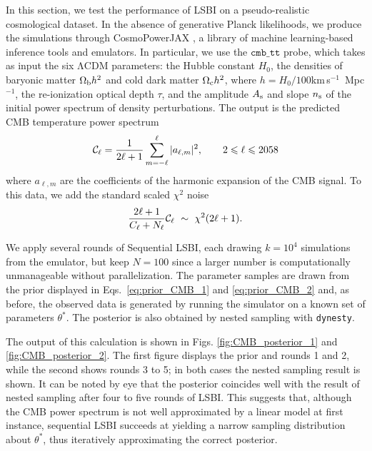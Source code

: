 \documentclass[%
 reprint,
 amsmath,amssymb,
 aps,
]{revtex4-2}
\begin{document}
In this section, we test the performance of LSBI on a pseudo-realistic cosmological dataset. In the absence of generative Planck likelihoods, we produce the simulations through CosmoPowerJAX \cite{piras2023cosmopower,spurio2022cosmopower}, a library of machine learning-based inference tools and emulators. In particular, we use the $\texttt{cmb\_tt}$ probe, which takes as input the six $\mathrm{\Lambda}$CDM parameters: the Hubble constant $H_0$, the densities of baryonic matter $\Omega_\text{b}h^2$ and cold dark matter $\Omega_\text{c}h^2$, where $h = H_0/100$km\,s$^{-1}$\, Mpc$^{-1}$, the re-ionization optical depth $\tau$,  and the amplitude $A_\text{s}$ and slope $n_\text{s}$ of the initial power spectrum of density perturbations.
The output is the predicted CMB temperature power spectrum
\begin{equation}
	\mathcal{C}_\ell = \frac{1}{2\ell+1}\sum_{m=-\ell}^\ell |a_{\ell,m}|^2, \qquad 2\leqslant\ell\leqslant2058
\end{equation}
where $a_{\ell,m}$ are the coefficients of the harmonic expansion of the CMB signal. To this data, we add the standard scaled $\chi^2$ noise
\begin{equation}\label{eq:chi2noise}
	\f{2\ell+1}{C_\ell+N_\ell}\mathcal{C_\ell}\ \sim\  \chi^2(2\ell+1).
\end{equation}


 

We apply several rounds of Sequential LSBI, each drawing $k=10^4$ simulations from the emulator, but keep $N=100$ since a larger number is computationally unmanageable without parallelization. The parameter samples are drawn from the prior displayed in Eqs.~\ref{eq:prior_CMB_1} and \ref{eq:prior_CMB_2} and, as before, the observed data is generated by running the simulator on a known set of parameters $\theta^\ast$. The posterior is also obtained by nested sampling with \texttt{dynesty}.

The output of this calculation is shown in Figs. \ref{fig:CMB_posterior_1} and \ref{fig:CMB_posterior_2}. The first figure displays the prior and rounds 1 and 2, while the second shows rounds 3 to 5; in both cases the nested sampling result is shown.  It can be noted by eye that the posterior coincides well with the result of nested sampling after four to five rounds of LSBI. This suggests that, although the CMB power spectrum is not well approximated by a linear model at first instance, sequential LSBI succeeds at yielding a narrow sampling distribution about $\theta^\ast$,  thus iteratively approximating the correct posterior.  
\end{document}
